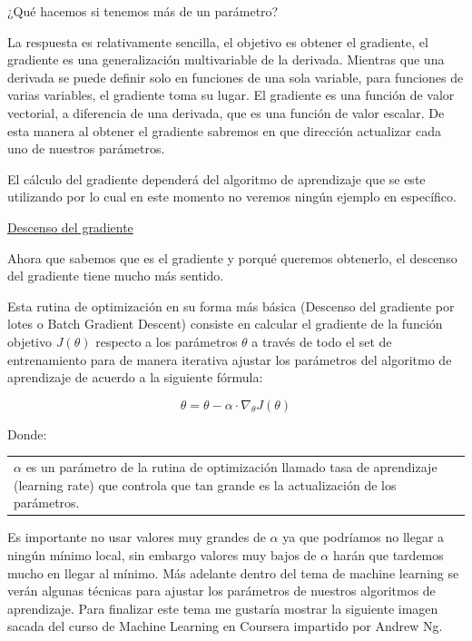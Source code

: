\documentclass[11pt,fleqn]{book} %
\begin{document}
¿Qué hacemos si tenemos más de un parámetro?

La respuesta es relativamente sencilla, el objetivo es obtener el gradiente, el gradiente es una generalización multivariable de la derivada. Mientras que una derivada se puede definir solo en funciones de una sola variable, para funciones de varias variables, el gradiente toma su lugar. El gradiente es una función de valor vectorial, a diferencia de una derivada, que es una función de valor escalar.  De esta manera al obtener el gradiente sabremos en que dirección actualizar cada uno de nuestros parámetros.

El cálculo del gradiente dependerá del algoritmo de aprendizaje que se este utilizando por lo cual en este momento no veremos ningún ejemplo en específico.

\underline{Descenso del gradiente}

Ahora que sabemos que es el gradiente y porqué queremos obtenerlo, el descenso del gradiente tiene mucho más sentido.

Esta rutina de optimización en su forma más básica (Descenso del gradiente por lotes o Batch Gradient Descent) consiste en calcular el gradiente de la función objetivo $J(\theta)$ respecto a los parámetros $\theta$ a través de todo el set de entrenamiento para de manera iterativa ajustar los parámetros del algoritmo de aprendizaje de acuerdo a la siguiente fórmula:

\begin{equation}
\label{eqn:gradient_descent}
\theta = \theta - \alpha \cdot  \nabla _{\theta} J(\theta)
\end{equation}

Donde: 

\begin{tabular}{l}
\makecell[l]{$\alpha$ es un parámetro de la rutina de optimización llamado tasa de aprendizaje (learning rate) que \\ controla que tan grande es la actualización de los parámetros.}
\end{tabular}

Es importante no usar valores muy grandes de $\alpha$ ya que podríamos no llegar a ningún mínimo local, sin embargo valores muy bajos de $\alpha$ harán que tardemos mucho en llegar al mínimo. Más adelante dentro del tema de machine learning se verán algunas técnicas para ajustar los parámetros de nuestros algoritmos de aprendizaje. Para finalizar este tema me gustaría mostrar la siguiente imagen sacada del curso de Machine Learning en Coursera impartido por Andrew Ng.
\end{document}
